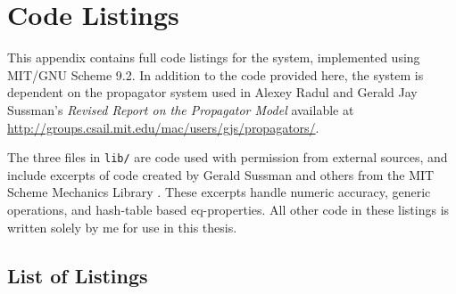 \chapter{Code Listings}
\label{chap:code}

This appendix contains full code listings for the system, implemented
using MIT/GNU Scheme 9.2. In addition to the code provided here, the
system is dependent on the propagator system used in Alexey Radul and
Gerald Jay Sussman's \emph{Revised Report on the Propagator Model}
available at
\url{http://groups.csail.mit.edu/mac/users/gjs/propagators/}.

The three files in \texttt{lib/} are code used with permission from
external sources, and include excerpts of code created by Gerald
Sussman and others from the MIT Scheme Mechanics Library
\cite{scmutils}. These excerpts handle numeric accuracy, generic
operations, and hash-table based eq-properties. All other code in
these listings is written solely by me for use in this thesis.

\section*{List of Listings}
\lolnoheading


\newcommand{\includecode}[2][c]{}
\newpage
\linespread{1}

\addtolength{\oddsidemargin}{-.4in}
\addtolength{\evensidemargin}{-.4in}
\addtolength{\textwidth}{0.8in}

